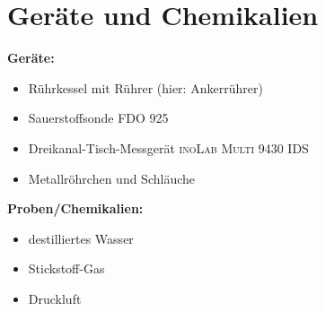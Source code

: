 \section{Geräte und Chemikalien}
\label{sec:geraete}

\textbf{Geräte:}
\begin{itemize}
\item Rührkessel mit Rührer (hier: Ankerrührer)
\item Sauerstoffsonde \textsc{FDO\textsuperscript{\textregistered} 925} 
\item Dreikanal-Tisch-Messgerät \textsc{inoLab\textsuperscript{\textregistered} Multi 9430 IDS} 
\item Metallröhrchen und Schläuche
\end{itemize}

\vspace*{5mm}

\textbf{Proben/Chemikalien:}
\begin{itemize}
\item destilliertes Wasser
\item Stickstoff-Gas 
\item Druckluft
\end{itemize}





